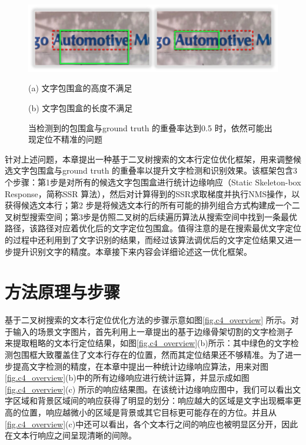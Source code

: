     \begin{figure}[!h]
    \centering
    \includegraphics[width=\textwidth]{./figures/c4_overlap.jpg}
    \begin{minipage}[t]{0.48\linewidth}
    \centerline{ \small (a) 文字包围盒的高度不满足}
    \end{minipage}
    \begin{minipage}[t]{0.48\linewidth}
    \centerline{ \small (b) 文字包围盒的长度不满足}
    \end{minipage}
    \caption{当检测到的包围盒与ground truth 的重叠率达到0.5 时，依然可能出现定位不精准的问题}
    \label{fig.c4_overlap}
    \end{figure}

    针对上述问题，本章提出一种基于二叉树搜索的文本行定位优化框架，用来调整候选文字包围盒与ground truth 的重叠率以提升文字检测和识别效果。该框架包含3个步骤：第1步是对所有的候选文字包围盒进行统计边缘响应（Static Skeleton-box Response，简称SSR 算法），然后对计算得到的SSR求取梯度并执行NMS操作，以获得候选文本行；第2 步是将候选文本行的所有可能的排列组合方式构建成一个二叉树型搜索空间；第3步是仿照二叉树的后续遍历算法从搜索空间中找到一条最优路径，该路径对应着优化后的文字定位包围盒。值得注意的是在搜索最优文字定位的过程中还利用到了文字识别的结果，而经过该算法调优后的文字定位结果又进一步提升识别文字的精度。本章接下来内容会详细论述这一优化框架。

    \section{方法原理与步骤}

    基于二叉树搜索的文本行定位优化方法的步骤示意如图\ref{fig.c4_overview} 所示。对于输入的场景文字图片，首先利用上一章提出的基于边缘骨架切割的文字检测子\cite{He2017scene} 来提取粗略的文本行定位结果，如图\ref{fig.c4_overview}(b)所示：其中绿色的文字检测包围框大致覆盖住了文本行存在的位置，然而其定位结果还不够精准。为了进一步提高文字检测的精度，在本章中提出一种统计边缘响应算法，用来对图\ref{fig.c4_overview}(b)中的所有边缘响应进行统计运算，并显示成如图\ref{fig.c4_overview}(c) 所示的响应结果图。在该统计边缘响应图中，我们可以看出文字区域和背景区域间的响应获得了明显的划分：响应越大的区域是文字出现概率更高的位置，响应越微小的区域是背景或其它目标更可能存在的方位。并且从\ref{fig.c4_overview}(c)中还可以看出，各个文本行之间的响应也被明显区分开，因此在文本行响应之间呈现清晰的间隙。

